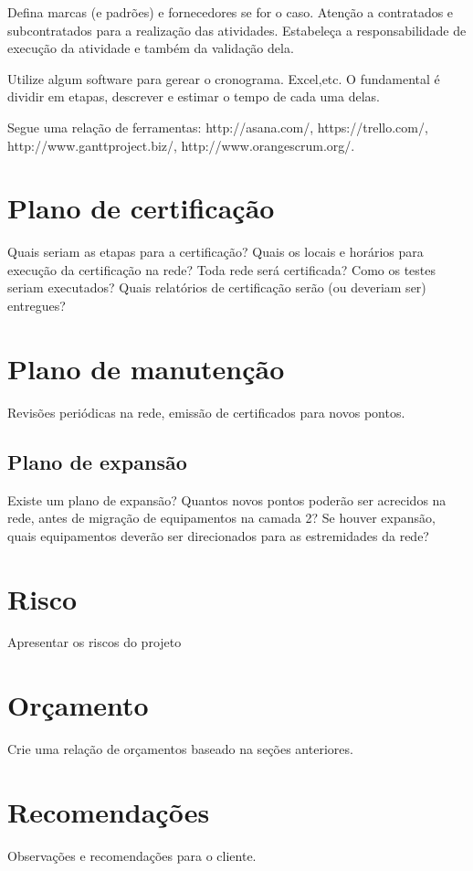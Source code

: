 \documentclass[	DIV=calc,%
							paper=a4,%
							fontsize=12pt,%
							onecolumn]{scrartcl}	 					%
\begin{document}
Defina marcas (e padrões) e fornecedores se for o caso. Atenção a contratados e subcontratados para a realização das atividades. Estabeleça a responsabilidade de execução da atividade e também da validação dela.

Utilize algum software para gerear o cronograma. Excel,etc. O fundamental é dividir em etapas, descrever e estimar o tempo de cada uma delas.

Segue uma relação de ferramentas:
http://asana.com/, 
https://trello.com/, 
http://www.ganttproject.biz/, 
http://www.orangescrum.org/. 

\section{Plano de certificação}
Quais seriam as etapas para a certificação? 
Quais os locais e horários para execução da certificação na rede? Toda rede será certificada?
Como os testes seriam executados?
Quais relatórios de certificação serão (ou deveriam ser) entregues? 

\section{Plano de manutenção}

Revisões periódicas na rede, emissão de certificados para novos pontos.

\subsection{Plano de expansão}
Existe um plano de expansão? Quantos novos pontos poderão ser acrecidos na rede, antes de migração de equipamentos na camada 2? Se houver expansão, quais equipamentos deverão ser direcionados para as estremidades da rede? 

\section{Risco}
Apresentar os riscos do projeto

\section{Orçamento}
Crie uma relação de orçamentos baseado na seções anteriores.

\section{Recomendações}
Observações e recomendações para o cliente.
\end{document}
